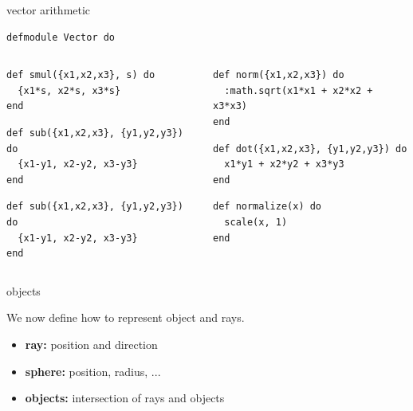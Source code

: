 \begin{frame}[fragile]{vector arithmetic}

\begin{verbatim}
defmodule Vector do
\end{verbatim}


\begin{columns}
  \begin{column}{0.5\linewidth}
  \begin{verbatim}
def smul({x1,x2,x3}, s) do
  {x1*s, x2*s, x3*s}
end
  \end{verbatim}
\pause
  \begin{verbatim}
def sub({x1,x2,x3}, {y1,y2,y3}) do
  {x1-y1, x2-y2, x3-y3}
end
  \end{verbatim}
\pause
  \begin{verbatim}
def sub({x1,x2,x3}, {y1,y2,y3}) do
  {x1-y1, x2-y2, x3-y3}
end
  \end{verbatim}
  \end{column}

  \pause

  \begin{column}{0.5\linewidth}
  \begin{verbatim}
def norm({x1,x2,x3}) do
  :math.sqrt(x1*x1 + x2*x2 + x3*x3)
end
  \end{verbatim}
  \begin{verbatim}
def dot({x1,x2,x3}, {y1,y2,y3}) do
  x1*y1 + x2*y2 + x3*y3
end
  \end{verbatim}
\pause
  \begin{verbatim}
def normalize(x) do
  scale(x, 1)
end
  \end{verbatim}
  \end{column}
 \end{columns}

\end{frame}

\begin{frame}[fragile]{objects}

We now define how to represent object and rays.

\pause
\begin{itemize}
  \item {\bf ray:} position and direction
  \item {\bf sphere:} position, radius, ...
  \item {\bf objects:} intersection of rays and objects
 \end{itemize}

\end{frame}

